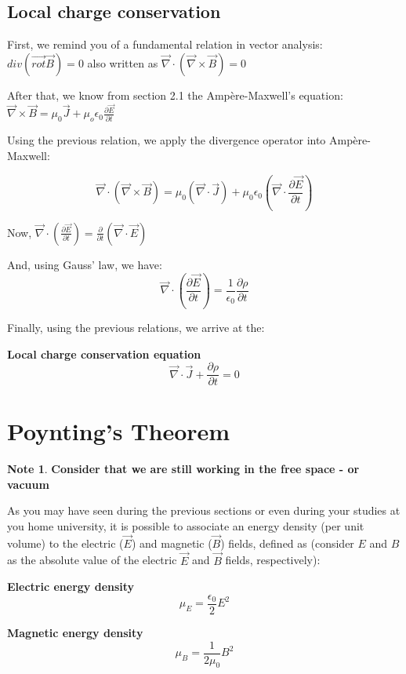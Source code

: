 \documentclass[11pt]{article}
\theoremstyle{definition}
\newtheorem{note}{Note}
\begin{document}
\subsection{Local charge conservation}
First, we remind you of a fundamental relation in vector analysis: $div\left(\vec{rot}\vec{B}\right) = 0$ also written as $\vec{\nabla} \cdot \left(\vec{\nabla} \times \vec{B}\right) = 0$

After that, we know from section 2.1 the Ampère-Maxwell's equation: $\vec{\nabla} \times \vec{B} = \mu_0 \vec{J} + \mu_o \epsilon_0 \frac{\partial \vec{E}}{\partial t}$

Using the previous relation, we apply the divergence operator into Ampère-Maxwell:

\begin{equation}
    \vec{\nabla} \cdot \left(\vec{\nabla} \times \vec{B}\right) = \mu_{0}\left(\vec{\nabla} \cdot \vec{J}\right) + \mu_{0} \epsilon_{0} \left(\vec{\nabla} \cdot \frac{\partial \vec{E}}{\partial t}\right)
\end{equation}

Now, $\vec{\nabla} \cdot \left(\frac{\partial \vec{E}}{\partial t}\right) = \frac{\partial}{\partial t}\left(\vec{\nabla} \cdot \vec{E}\right)$

And, using Gauss' law, we have:
\begin{equation}
    \vec{\nabla} \cdot \left(\frac{\partial \vec{E}}{\partial t}\right) = \frac{1}{\epsilon_{0}}\frac{\partial \rho}{\partial t}
\end{equation}

Finally, using the previous relations, we arrive at the:
\begin{shaded}
    \textbf{Local charge conservation equation}
    \begin{equation}
        \vec{\nabla} \cdot \vec{J} + \frac{\partial \rho}{\partial t} = 0
    \end{equation}
\end{shaded}

\newpage
\section{Poynting's Theorem}
\begin{note}
    \textbf{Consider that we are still working in the free space - or vacuum}
\end{note}
As you may have seen during the previous sections or even during your studies at you home university, it is possible to associate
an energy density (per unit volume) to the electric ($\vec{E}$) and magnetic ($\vec{B}$) fields, defined as (consider $E$ and $B$ as the absolute value of the electric $\vec{E}$ and $\vec{B}$ fields, respectively):
\begin{shaded}
    \textbf{Electric energy density}
    \begin{equation}
        \mu_{E} = \frac{\epsilon_{0}}{2}E^2
    \end{equation}

    \textbf{Magnetic energy density}
    \begin{equation}
        \mu_{B} = \frac{1}{2\mu_{0}}B^2
    \end{equation}
\end{shaded}
\end{document}
